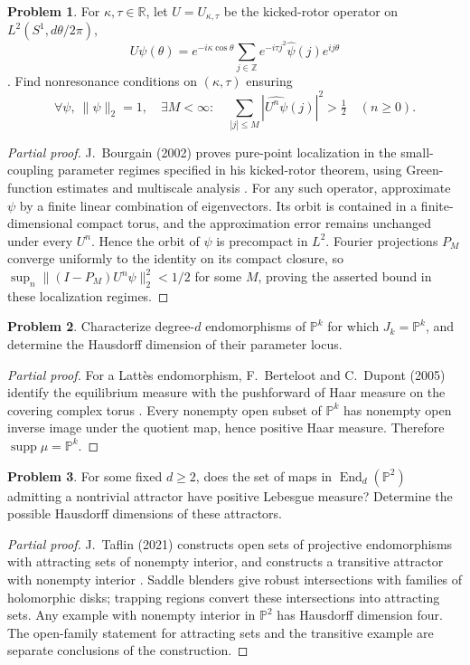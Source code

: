\documentclass[11pt,reqno]{amsart}
\theoremstyle{definition}
\newtheorem{problem}{Problem}[section]
\theoremstyle{remark}
\begin{document}
\begin{problem}\label{FS-2.12b}
For $\kappa,\tau\in\mathbb R$, let $U=U_{\kappa,\tau}$ be the kicked-rotor operator on $L^2(S^1,d\theta/2\pi)$,
\[
 U\psi(\theta)=e^{-i\kappa\cos\theta}
 \sum_{j\in\mathbb Z}e^{-i\tau j^2}\widehat\psi(j)e^{ij\theta}
\]
\cite[Question~2.12]{FS2001}. Find nonresonance conditions on $(\kappa,\tau)$ ensuring
\[
 \forall\psi,\ \|\psi\|_2=1,\quad\exists M<\infty:\quad
 \sum_{|j|\leq M}|\widehat{U^n\psi}(j)|^2>\tfrac12
 \quad(n\geq0).
\]
\end{problem}
\begin{proof}[Partial proof]
J.~Bourgain (2002) proves pure-point localization in the small-coupling parameter regimes specified in his kicked-rotor theorem, using Green-function estimates and multiscale analysis \cite{FS-Bourgain}. For any such operator, approximate $\psi$ by a finite linear combination of eigenvectors. Its orbit is contained in a finite-dimensional compact torus, and the approximation error remains unchanged under every $U^n$. Hence the orbit of $\psi$ is precompact in $L^2$. Fourier projections $P_M$ converge uniformly to the identity on its compact closure, so $\sup_n\|(I-P_M)U^n\psi\|_2^2<1/2$ for some $M$, proving the asserted bound in these localization regimes.
\end{proof}

\begin{problem}\label{FS-2.21}
Characterize degree-$d$ endomorphisms of $\mathbb P^k$ for which $J_k=\mathbb P^k$, and determine the Hausdorff dimension of their parameter locus.
\end{problem}
\begin{proof}[Partial proof]
For a Latt\`es endomorphism, F.~Berteloot and C.~Dupont (2005) identify the equilibrium measure with the pushforward of Haar measure on the covering complex torus \cite{FS-BD}. Every nonempty open subset of $\mathbb P^k$ has nonempty open inverse image under the quotient map, hence positive Haar measure. Therefore $\operatorname{supp}\mu=\mathbb P^k$.
\end{proof}

\begin{problem}\label{FS-2.22}
For some fixed $d\geq2$, does the set of maps in $\operatorname{End}_d(\mathbb P^2)$ admitting a nontrivial attractor have positive Lebesgue measure? Determine the possible Hausdorff dimensions of these attractors.
\end{problem}
\begin{proof}[Partial proof]
J.~Taflin (2021) constructs open sets of projective endomorphisms with attracting sets of nonempty interior, and constructs a transitive attractor with nonempty interior \cite{FS-Taflin}. Saddle blenders give robust intersections with families of holomorphic disks; trapping regions convert these intersections into attracting sets. Any example with nonempty interior in $\mathbb P^2$ has Hausdorff dimension four. The open-family statement for attracting sets and the transitive example are separate conclusions of the construction.
\end{proof}
\end{document}
